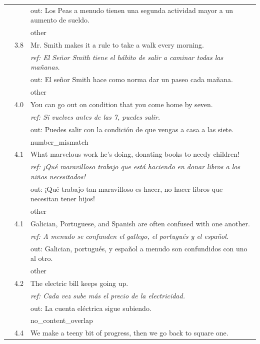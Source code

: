 \begin{longtable}{@{}rp{0.7cm}p{11cm}@{}}
& & \small\ttfamily out: Los Peas a menudo tienen una segunda actividad mayor a un aumento de sueldo. \\
& & \scriptsize other \\\addlinespace
13 & 3.8 & \small Mr. Smith makes it a rule to take a walk every morning. \\
& & \small\itshape ref: El Señor Smith tiene el hábito de salir a caminar todas las mañanas. \\
& & \small\ttfamily out: El señor Smith hace como norma dar un paseo cada mañana. \\
& & \scriptsize other \\\addlinespace
14 & 4.0 & \small You can go out on condition that you come home by seven. \\
& & \small\itshape ref: Si vuelves antes de las 7, puedes salir. \\
& & \small\ttfamily out: Puedes salir con la condición de que vengas a casa a las siete. \\
& & \scriptsize number\_mismatch \\\addlinespace
15 & 4.1 & \small What marvelous work he's doing, donating books to needy children! \\
& & \small\itshape ref: ¡Qué maravilloso trabajo que está haciendo en donar libros a los niños necesitados! \\
& & \small\ttfamily out: ¡Qué trabajo tan maravilloso es hacer, no hacer libros que necesitan tener hijos! \\
& & \scriptsize other \\\addlinespace
16 & 4.1 & \small Galician, Portuguese, and Spanish are often confused with one another. \\
& & \small\itshape ref: A menudo se confunden el gallego, el portugués y el español. \\
& & \small\ttfamily out: Galician, portugués, y español a menudo son confundidos con uno al otro. \\
& & \scriptsize other \\\addlinespace
17 & 4.2 & \small The electric bill keeps going up. \\
& & \small\itshape ref: Cada vez sube más el precio de la electricidad. \\
& & \small\ttfamily out: La cuenta eléctrica sigue subiendo. \\
& & \scriptsize no\_content\_overlap \\\addlinespace
18 & 4.4 & \small We make a teeny bit of progress, then we go back to square one. \\

\end{longtable}
